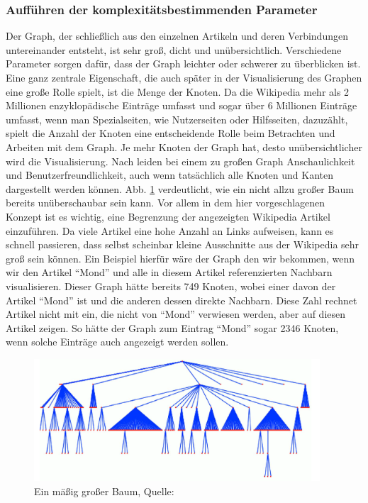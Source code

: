 \documentclass[12pt, a4paper]{article}
\begin{document}
\subsubsection{Aufführen der komplexitätsbestimmenden Parameter}
Der Graph, der schließlich aus den einzelnen Artikeln und deren Verbindungen untereinander entsteht, ist sehr groß, dicht und unübersichtlich. Verschiedene Parameter sorgen dafür, dass der Graph leichter oder schwerer zu überblicken ist.\\

Eine ganz zentrale Eigenschaft, die auch später in der Visualisierung des Graphen eine große Rolle spielt, ist die Menge der Knoten. Da die Wikipedia mehr als 2 Millionen enzyklopädische Einträge umfasst und sogar über 6 Millionen Einträge umfasst, wenn man Spezialseiten, wie Nutzerseiten oder Hilfsseiten, dazuzählt, spielt die Anzahl der Knoten eine entscheidende Rolle beim Betrachten und Arbeiten mit dem Graph. Je mehr Knoten der Graph hat, desto unübersichtlicher wird die Visualisierung. Nach leiden bei einem zu großen Graph Anschaulichkeit und Benutzerfreundlichkeit, auch wenn tatsächlich alle Knoten und Kanten dargestellt werden können. Abb. \ref{hermanBigGraph} verdeutlicht, wie ein nicht allzu großer Baum bereits unüberschaubar sein kann. Vor allem in dem hier vorgeschlagenen Konzept ist es wichtig, eine Begrenzung der angezeigten Wikipedia Artikel einzuführen. Da viele Artikel eine hohe Anzahl an Links aufweisen, kann es schnell passieren, dass selbst scheinbar kleine Ausschnitte aus der Wikipedia sehr groß sein können. Ein Beispiel hierfür wäre der Graph den wir bekommen, wenn wir den Artikel "`Mond"' und alle in diesem Artikel referenzierten Nachbarn visualisieren. Dieser Graph hätte bereits 749 Knoten, wobei einer davon der Artikel "`Mond"' ist und die anderen dessen direkte Nachbarn. Diese Zahl rechnet Artikel nicht mit ein, die nicht von "`Mond"' verwiesen werden, aber auf diesen Artikel zeigen. So hätte der Graph zum Eintrag "`Mond"' sogar 2346 Knoten, wenn solche Einträge auch angezeigt werden sollen.\\

\begin{figure}[h!]
\centering
\includegraphics[width=0.95\textwidth]{hermanBigGraph.png}
\caption[Ein mäßig großer Baum]{Ein mäßig großer Baum, Quelle: \protect{}}
\label{hermanBigGraph}
\end{figure}
\end{document}
